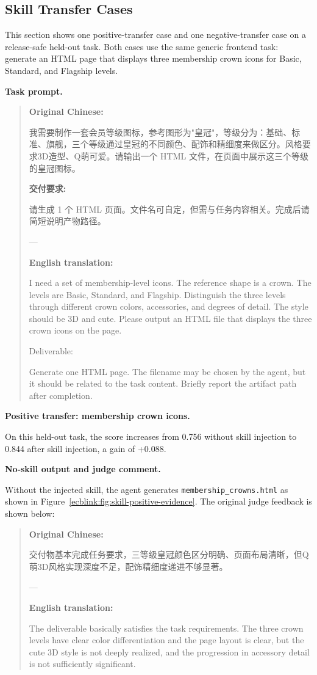 \documentclass[11pt, a4paper, copyright, frontis]{frontis}
\newcommand{\inlinett}[1]{{\footnotesize\texttt{#1}}}
\newcommand{\caseheader}[1]{\noindent\colorbox{fbcaseblue}{\parbox{0.96\linewidth}{\color{white}\bfseries #1}}\vspace{0.5mm}\newline}
\newenvironment{casebox}{%
  \begin{quote}%
  \setlength{\parindent}{0pt}%
  \setlength{\parskip}{0pt}%
}{%
  \end{quote}%
}
\begin{document}
\subsection{Skill Transfer Cases}
This section shows one positive-transfer case and one negative-transfer case on a release-safe held-out task. Both cases use the same generic frontend task: generate an HTML page that displays three membership crown icons for Basic, Standard, and Flagship levels. 

\caseheader{Task prompt.}
\begin{casebox}\scriptsize\raggedright
\textbf{Original Chinese:}

我需要制作一套会员等级图标，参考图形为"皇冠"，等级分为：基础、标准、旗舰，三个等级通过皇冠的不同颜色、配饰和精细度来做区分。风格要求3D造型、Q萌可爱。请输出一个 HTML 文件，在页面中展示这三个等级的皇冠图标。

\textbf{交付要求:}

请生成 1 个 HTML 页面。文件名可自定，但需与任务内容相关。完成后请简短说明产物路径。

---

\textbf{English translation:}

I need a set of membership-level icons. The reference shape is a crown. The levels are Basic, Standard, and Flagship. Distinguish the three levels through different crown colors, accessories, and degrees of detail. The style should be 3D and cute. Please output an HTML file that displays the three crown icons on the page.

Deliverable:

Generate one HTML page. The filename may be chosen by the agent, but it should be related to the task content. Briefly report the artifact path after completion.
\end{casebox}

\caseheader{Positive transfer: membership crown icons.}
On this held-out task, the score increases from 0.756 without skill injection to 0.844 after skill injection, a gain of +0.088.

\caseheader{No-skill output and judge comment.}
Without the injected skill, the agent generates \inlinett{membership\_crowns.html} as shown in Figure~\ref{ecblink:fig:skill-positive-evidence}. The original judge feedback is shown below:
\begin{casebox}\scriptsize\raggedright
\textbf{Original Chinese:}

交付物基本完成任务要求，三等级皇冠颜色区分明确、页面布局清晰，但Q萌3D风格实现深度不足，配饰精细度递进不够显著。

---

\textbf{English translation:}

The deliverable basically satisfies the task requirements. The three crown levels have clear color differentiation and the page layout is clear, but the cute 3D style is not deeply realized, and the progression in accessory detail is not sufficiently significant.
\end{casebox}
\end{document}
